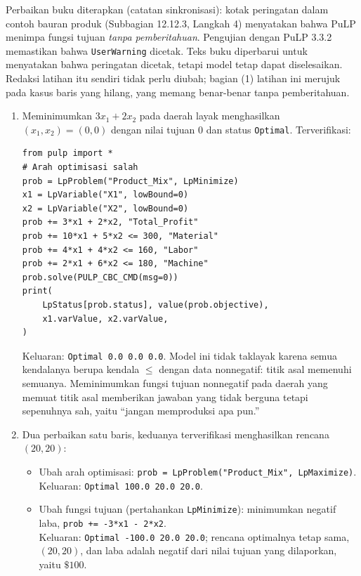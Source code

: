 \begin{qaflag}
Perbaikan buku diterapkan (catatan sinkronisasi): kotak peringatan dalam
contoh bauran produk (Subbagian 12.12.3, Langkah 4) menyatakan bahwa PuLP
menimpa fungsi tujuan \emph{tanpa pemberitahuan}. Pengujian dengan PuLP 3.3.2
memastikan bahwa \texttt{UserWarning} dicetak. Teks buku diperbarui untuk
menyatakan bahwa peringatan dicetak, tetapi model tetap dapat diselesaikan.
Redaksi latihan itu sendiri tidak perlu diubah; bagian (1) latihan ini merujuk
pada kasus baris yang hilang, yang memang benar-benar tanpa pemberitahuan.
\end{qaflag}


\begin{enumerate}
\item Meminimumkan $3x_1 + 2x_2$ pada daerah layak menghasilkan
$(x_1, x_2) = (0, 0)$ dengan nilai tujuan $0$ dan status
\texttt{Optimal}. Terverifikasi:

\begin{verbatim}
from pulp import *
# Arah optimisasi salah
prob = LpProblem("Product_Mix", LpMinimize)
x1 = LpVariable("X1", lowBound=0)
x2 = LpVariable("X2", lowBound=0)
prob += 3*x1 + 2*x2, "Total_Profit"
prob += 10*x1 + 5*x2 <= 300, "Material"
prob += 4*x1 + 4*x2 <= 160, "Labor"
prob += 2*x1 + 6*x2 <= 180, "Machine"
prob.solve(PULP_CBC_CMD(msg=0))
print(
    LpStatus[prob.status], value(prob.objective),
    x1.varValue, x2.varValue,
)
\end{verbatim}

Keluaran: \texttt{Optimal 0.0 0.0 0.0}. Model ini tidak taklayak karena semua
kendalanya berupa kendala $\leq$ dengan data nonnegatif: titik asal memenuhi
semuanya. Meminimumkan fungsi tujuan nonnegatif pada daerah yang memuat titik
asal memberikan jawaban yang tidak berguna tetapi sepenuhnya sah, yaitu
``jangan memproduksi apa pun.''

\item Dua perbaikan satu baris, keduanya terverifikasi menghasilkan rencana
$(20, 20)$:
\begin{itemize}
\item Ubah arah optimisasi:
\texttt{prob = LpProblem("Product\_Mix", LpMaximize)}. \\
Keluaran: \texttt{Optimal 100.0 20.0 20.0}.
\item Ubah fungsi tujuan (pertahankan \texttt{LpMinimize}): minimumkan
negatif laba, \texttt{prob += -3*x1 - 2*x2}. \\
Keluaran: \texttt{Optimal -100.0 20.0 20.0}; rencana optimalnya tetap sama,
$(20,20)$, dan laba adalah negatif dari nilai tujuan yang dilaporkan, yaitu
$\$100$.
\end{itemize}


\end{enumerate}

